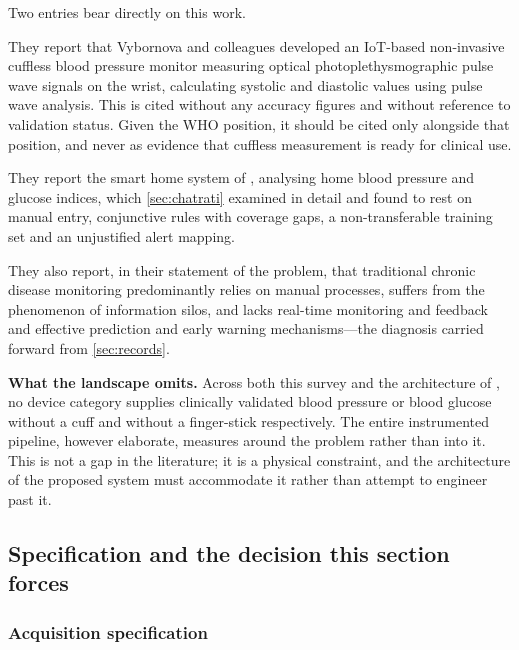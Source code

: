 \documentclass[12pt,a4paper,oneside]{report}
\begin{document}
Two entries bear directly on this work.

They report that Vybornova and colleagues developed an IoT-based non-invasive cuffless blood pressure monitor measuring optical photoplethysmographic pulse wave signals on the wrist, calculating systolic and diastolic values using pulse wave analysis. This is cited without any accuracy figures and without reference to validation status. Given the WHO position, it should be cited only alongside that position, and never as evidence that cuffless measurement is ready for clinical use.

They report the smart home system of \textcite{chatrati2022}, analysing home blood pressure and glucose indices, which \cref{sec:chatrati} examined in detail and found to rest on manual entry, conjunctive rules with coverage gaps, a non-transferable training set and an unjustified alert mapping.

They also report, in their statement of the problem, that traditional chronic disease monitoring predominantly relies on manual processes, suffers from the phenomenon of information silos, and lacks real-time monitoring and feedback and effective prediction and early warning mechanisms---the diagnosis carried forward from \cref{sec:records}.

\textbf{What the landscape omits.} Across both this survey and the architecture of \textcite{efendi2025}, no device category supplies clinically validated blood pressure or blood glucose without a cuff and without a finger-stick respectively. The entire instrumented pipeline, however elaborate, measures around the problem rather than into it. This is not a gap in the literature; it is a physical constraint, and the architecture of the proposed system must accommodate it rather than attempt to engineer past it.

\subsection{Specification and the decision this section forces}\label{sec:spec21}

\subsubsection{Acquisition specification}
\end{document}
